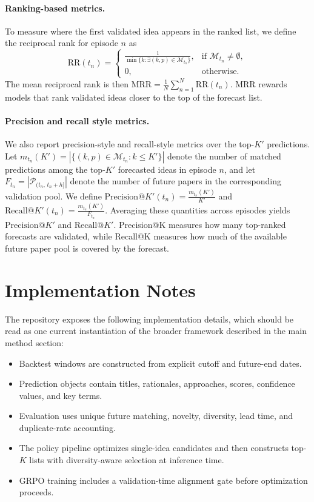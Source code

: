 \documentclass{article} %
\begin{document}
\paragraph{Ranking-based metrics.}
To measure where the first validated idea appears in the ranked list, we define the reciprocal rank for episode $n$ as
$$
\mathrm{RR}(t_n) =
\begin{cases}
\frac{1}{\min\{k : \exists (k,p)\in \mathcal{M}_{t_n}\}}, & \text{if } \mathcal{M}_{t_n} \neq \emptyset,\\[6pt]
0, & \text{otherwise.}
\end{cases}
$$
The mean reciprocal rank is then
$
\mathrm{MRR} = \frac{1}{N}\sum_{n=1}^{N}\mathrm{RR}(t_n).
$
MRR rewards models that rank validated ideas closer to the top of the forecast list.

\paragraph{Precision and recall style metrics.}
We also report precision-style and recall-style metrics over the top-$K'$ predictions. Let
$
m_{t_n}(K') = \left|\{(k,p)\in \mathcal{M}_{t_n} : k \le K'\}\right|
$
denote the number of matched predictions among the top-$K'$ forecasted ideas in episode $n$, and let
$
F_{t_n} = \left|\mathcal{P}_{(t_n,\,t_n+h]}\right|
$
denote the number of future papers in the corresponding validation pool. We define
$
\mathrm{Precision@}K'(t_n) = \frac{m_{t_n}(K')}{K'}
$
and
$
\mathrm{Recall@}K'(t_n) = \frac{m_{t_n}(K')}{F_{t_n}}.
$
Averaging these quantities across episodes yields $\mathrm{Precision@}K'$ and $\mathrm{Recall@}K'$. Precision@K measures how many top-ranked forecasts are validated, while Recall@K measures how much of the available future paper pool is covered by the forecast.


\section{Implementation Notes}

The repository exposes the following implementation details, which should be read as one current instantiation of the broader framework described in the main method section:
\begin{itemize}
    \item Backtest windows are constructed from explicit cutoff and future-end dates.
    \item Prediction objects contain titles, rationales, approaches, scores, confidence values, and key terms.
    \item Evaluation uses unique future matching, novelty, diversity, lead time, and duplicate-rate accounting.
    \item The policy pipeline optimizes single-idea candidates and then constructs top-$K$ lists with diversity-aware selection at inference time.
    \item GRPO training includes a validation-time alignment gate before optimization proceeds.
\end{itemize}
\end{document}
